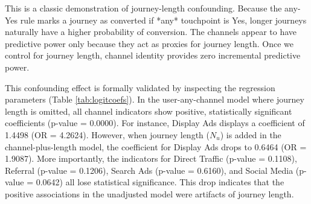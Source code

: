 \documentclass[pdflatex,sn-basic,Numbered]{sn-jnl}
\begin{document}
This is a classic demonstration of journey-length confounding. Because the any-Yes rule marks a journey as converted if *any* touchpoint is Yes, longer journeys naturally have a higher probability of conversion. The channels appear to have predictive power only because they act as proxies for journey length. Once we control for journey length, channel identity provides zero incremental predictive power.

This confounding effect is formally validated by inspecting the regression parameters (Table \ref{tab:logitcoefs}). In the user-any-channel model where journey length is omitted, all channel indicators show positive, statistically significant coefficients (p-value = 0.0000). For instance, Display Ads displays a coefficient of 1.4498 (OR = 4.2624). However, when journey length ($N_u$) is added in the channel-plus-length model, the coefficient for Display Ads drops to 0.6464 (OR = 1.9087). More importantly, the indicators for Direct Traffic (p-value = 0.1108), Referral (p-value = 0.1206), Search Ads (p-value = 0.6160), and Social Media (p-value = 0.0642) all lose statistical significance. This drop indicates that the positive associations in the unadjusted model were artifacts of journey length.
\end{document}
